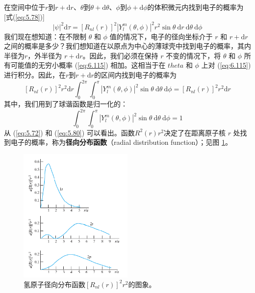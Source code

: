     在空间中位于$r$到$r+\mathrm{d}r$、$\theta$到$\theta+\mathrm{d}\theta$、$\phi$到$\phi+\mathrm{d}\phi$的体积微元内找到电子的概率为[式(\ref{eq:5.78})]
    \begin{equation}
        \left|\psi\right|^2\mathrm{d}\tau = \left[R_{nl}\left(r\right)\right]^2\left|Y_l^m\left(\theta,\phi\right)\right|^2r^2\sin\theta\:\mathrm{d}r\:\mathrm{d}\theta\:\mathrm{d}\phi
        \label{eq:6.115}
    \end{equation}
    我们现在想知道：在不限制 $\theta$ 和 $\phi$ 值的情况下，电子的径向坐标介于 $r$ 和 $r + \mathrm{d}r$ 之间的概率是多少？我们想知道在以原点为中心的薄球壳中找到电子的概率，其内半径为$r$，外半径为 $r + \mathrm{d}r$。因此，我们必须在保持 $r$ 不变的情况下，将 $\theta$ 和 $\phi$ 所有可能值的无穷小概率 (\ref{eq:6.115}) 相加。这相当于在 $theta$ 和 $\phi$ 上对 (\ref{eq:6.115}) 进行积分。因此，在$r$到$r+\mathrm{d}r$的区间内找到电子的概率为
    \begin{equation}
        \left[R_{nl}\left(r\right)\right]^2r^2\mathrm{d}r\int_{0}^{2\pi}\int_{0}^{\pi}\left|Y_l^m\left(\theta,\phi\right)\right|^2\sin\theta\:\mathrm{d}\theta\:\mathrm{d}\phi = \left[R_{nl}\left(r\right)\right]^2r^2\mathrm{d}r
        \label{eq:6.116}
    \end{equation}
    其中，我们用到了球谐函数是归一化的：
    \begin{equation}
        \boxed{
            \int_{0}^{2\pi}\int_{0}^{\pi}\left|Y_l^m\left(\theta,\phi\right)\right|^2\sin\theta\:\mathrm{d}\theta\:\mathrm{d}\phi = 1
        }
        \label{eq:6.117}
    \end{equation}
    从 (\ref{eq:5.72}) 和 (\ref{eq:5.80}) 可以看出。函数$R^2\left(r\right)r^2$决定了在距离原子核 $r$ 处找到电子的概率，称为\textbf{径向分布函数}（radial distribution function）；见图 \ref{fig:6.9}。
    \begin{figure}[ht]
        \centering
        \includegraphics[width=0.5\textwidth]{Figures/6.9.png}
        \caption{氢原子径向分布函数$\left[R_{nl}\left(r\right)\right]^2r^2$的图象。}
        \label{fig:6.9}
    \end{figure}

